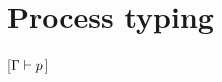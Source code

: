 \section{Process typing}
\label{sec:process-typing}


[$\Ptyping p$]
\begin{mathpar}


\end{mathpar}


